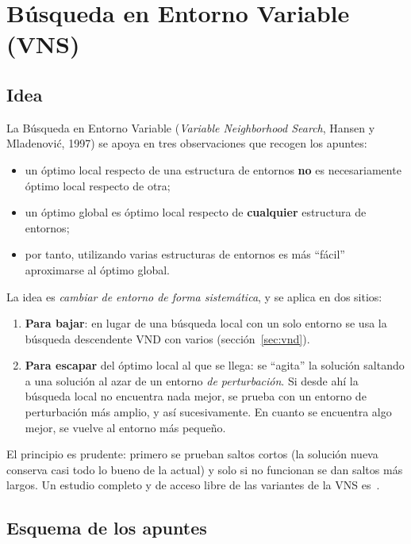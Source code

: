 \section{Búsqueda en Entorno Variable (VNS)}\label{sec:vns}

\subsection{Idea}

La Búsqueda en Entorno Variable (\emph{Variable Neighborhood Search}, Hansen y Mladenović,
1997) se apoya en tres observaciones que recogen los apuntes:
\begin{itemize}
  \item un óptimo local respecto de una estructura de entornos \textbf{no} es necesariamente
        óptimo local respecto de otra;
  \item un óptimo global es óptimo local respecto de \textbf{cualquier} estructura de
        entornos;
  \item por tanto, utilizando varias estructuras de entornos es más ``fácil'' aproximarse al
        óptimo global.
\end{itemize}
La idea es \emph{cambiar de entorno de forma sistemática}, y se aplica en dos sitios:
\begin{enumerate}
  \item \textbf{Para bajar}: en lugar de una búsqueda local con un solo entorno se usa la
        búsqueda descendente VND con varios (sección~\ref{sec:vnd}).
  \item \textbf{Para escapar} del óptimo local al que se llega: se ``agita'' la solución
        saltando a una solución al azar de un entorno \emph{de perturbación}. Si desde ahí la
        búsqueda local no encuentra nada mejor, se prueba con un entorno de perturbación más
        amplio, y así sucesivamente. En cuanto se encuentra algo mejor, se vuelve al entorno
        más pequeño.
\end{enumerate}
El principio es prudente: primero se prueban saltos cortos (la solución nueva conserva casi
todo lo bueno de la actual) y solo si no funcionan se dan saltos más largos. Un estudio
completo y de acceso libre de las variantes de la VNS es~\cite{vnsbasics}.

\subsection{Esquema de los apuntes}

